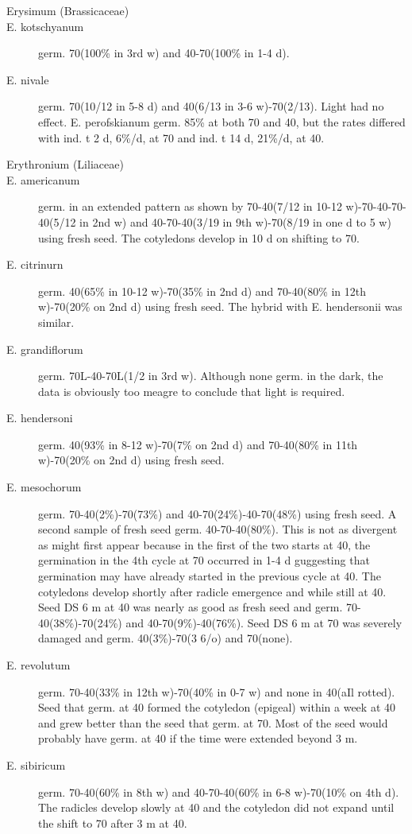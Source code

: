 \begin{description}
\item[Erysimum (Brassicaceae)]
\item[E. kotschyanum] germ. 70(100\% in 3rd w) and 40-70(100\% in 1-4 d).
\item[E. nivale] germ. 70(10/12 in 5-8 d) and 40(6/13 in 3-6 w)-70(2/13). Light had no
effect. E. perofskianum germ. 85\% at both 70 and 40, but the rates differed with ind. t 2
d, 6\%/d, at 70 and ind. t 14 d, 21\%/d, at 40.

\item[Erythronium (Liliaceae)]
\item[E. americanum] germ. in an extended pattern as shown by 70-40(7/12 in 10-12
w)-70-40-70-40(5/12 in 2nd w) and 40-70-40(3/19 in 9th w)-70(8/19 in one d to 5 w)
using fresh seed. The cotyledons develop in 10 d on shifting to 70.
\item[E. citrinurn] germ. 40(65\% in 10-12 w)-70(35\% in 2nd d) and 70-40(80\% in 12th
w)-70(20\% on 2nd d) using fresh seed. The hybrid with E. hendersonii was similar.
\item[E. grandiflorum] germ. 70L-40-70L(1/2 in 3rd w). Although none germ. in the
dark, the data is obviously too meagre to conclude that light is required.

\item[E. hendersoni] germ. 40(93\% in 8-12 w)-70(7\% on 2nd d) and 70-40(80\% in
11th w)-70(20\% on 2nd d) using fresh seed.
\item[E. mesochorum] germ. 70-40(2\%)-70(73\%) and 40-70(24\%)-40-70(48\%) using
fresh seed. A second sample of fresh seed germ. 40-70-40(80\%). This is not as
divergent as might first appear because in the first of the two starts at 40, the
germination in the 4th cycle at 70 occurred in 1-4 d guggesting that germination may
have already started in the previous cycle at 40. The cotyledons develop shortly after
radicle emergence and while still at 40. Seed DS 6 m at 40 was nearly as good as
fresh seed and germ. 70-40(38\%)-70(24\%) and 40-70(9\%)-40(76\%). Seed DS 6 m at
70 was severely damaged and germ. 40(3\%)-70(3 6/o) and 70(none).
\item[E. revolutum] germ. 70-40(33\% in 12th w)-70(40\% in 0-7 w) and none in 40(aIl
rotted). Seed that germ. at 40 formed the cotyledon (epigeal) within a week at 40 and
grew better than the seed that germ. at 70. Most of the seed would probably have
germ. at 40 if the time were extended beyond 3 m.
\item[E. sibiricum] germ. 70-40(60\% in 8th w) and 40-70-40(60\% in 6-8 w)-70(10\% on
4th d). The radicles develop slowly at 40 and the cotyledon did not expand until the
shift to 70 after 3 m at 40.


\end{description}
